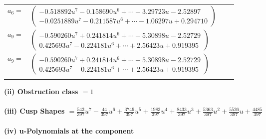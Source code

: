 \documentclass[1p]{elsarticle_modified}
\theoremstyle{definition}
\begin{document}
\begin{tabular}{m{7pt} m{180pt} m{7pt} m{180pt} }
\flushright $a_{6}=$&$\begin{pmatrix}-0.518892 u^{7}-0.158690 u^{6}+\cdots-3.29723 u-2.52897\\-0.0251889 u^{7}-0.211587 u^{6}+\cdots-1.06297 u+0.294710\end{pmatrix}$ \\
\flushright $a_{9}=$&$\begin{pmatrix}-0.590260 u^{7}+0.241814 u^{6}+\cdots-5.30898 u-2.52729\\0.425693 u^{7}-0.224181 u^{6}+\cdots+2.56423 u+0.919395\end{pmatrix}$\\ \flushright $a_{9}=$&$\begin{pmatrix}-0.590260 u^{7}+0.241814 u^{6}+\cdots-5.30898 u-2.52729\\0.425693 u^{7}-0.224181 u^{6}+\cdots+2.56423 u+0.919395\end{pmatrix}$\\&\end{tabular}
\flushleft \textbf{(ii) Obstruction class $= 1$}\\~\\
\flushleft \textbf{(iii) Cusp Shapes $= \frac{543}{397} u^7-\frac{44}{397} u^6+\frac{3749}{397} u^5+\frac{1983}{397} u^4+\frac{8433}{397} u^3+\frac{5363}{397} u^2+\frac{5526}{397} u+\frac{4485}{397}$}\\~\\
\newpage\renewcommand{\arraystretch}{1}
\flushleft \textbf{(iv) u-Polynomials at the component}\newline \\
\end{document}
